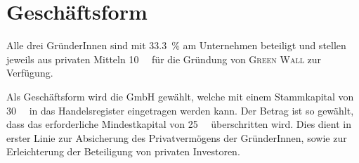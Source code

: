     \section{Geschäftsform}

    Alle drei GründerInnen sind mit \qty{33.3}{\percent} am Unternehmen beteiligt und stellen jeweils aus privaten Mitteln \qty{10}{\kilo\EUR} für die Gründung von \textsc{Green Wall} zur Verfügung.

    Als Geschäftsform wird die GmbH gewählt, welche mit einem Stammkapital von \qty{30}{\kilo\EUR} in das Handelsregister eingetragen werden kann. 
    Der Betrag ist so gewählt, dass das erforderliche Mindestkapital von \qty{25}{\kilo\EUR} überschritten wird. 
    Dies dient in erster Linie zur Absicherung des Privatvermögens der GründerInnen, sowie zur Erleichterung der Beteiligung von privaten Investoren. 
    